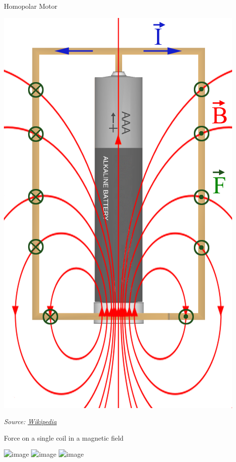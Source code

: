 \documentclass[compress]{beamer}
\newcommand{\source}[2]{{\tiny\it Source: \href{#1}{#2}}}
\begin{document}
\begin{frame}{Homopolar Motor}
\begin{center}
        \includegraphics[height=0.6\paperheight]{image11}
    \end{center}

    \source{https://en.wikipedia.org/wiki/Homopolar_motor}{Wikipedia}
\end{frame}

\begin{frame}{Force on a single coil in a magnetic field}

    \begin{center}
        \includegraphics<1>[width=0.8\linewidth]{conductor-in-magnetic-field-0}
        \includegraphics<2>[width=0.8\linewidth]{conductor-in-magnetic-field-1}
        \includegraphics<3>[width=0.8\linewidth]{conductor-in-magnetic-field-2}
    \end{center}
\end{frame}
\end{document}
